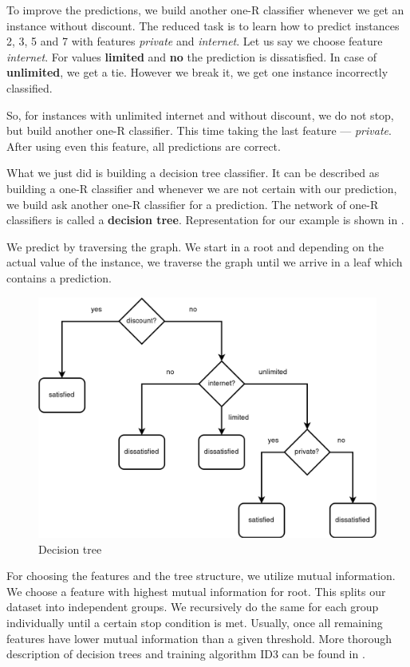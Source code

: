 To improve the predictions, we build another one-R classifier
whenever we get an instance without discount.
The reduced task is to learn how to predict instances 2, 3, 5 and 7 with features \textit{private} and \textit{internet}.
Let us say we choose feature \textit{internet}.
For values \textbf{limited} and \textbf{no} the prediction is dissatisfied.
In case of \textbf{unlimited}, we get a tie.
However we break it, we get one instance incorrectly classified.

So, for instances with unlimited internet and without discount, we do not stop, but
build another one-R classifier.
This time taking the last feature --- \textit{private}.
After using even this feature, all predictions are correct.

What we just did is building a decision tree classifier.
It can be described as
building a one-R classifier and whenever we are not certain with our prediction,
we build ask another one-R classifier for a prediction.
The network of one-R classifiers is called a \textbf{decision tree}.
Representation for our example is shown in .

We predict by traversing the graph.
We start in a root and depending on the actual value of the instance,
we traverse the graph until we arrive in a leaf which contains a prediction.

\begin{figure}[h]
	\centering
	\includegraphics[width=\textwidth]{figures/decisiontree.png}
	\caption{Decision tree} \label{fig:tree}
\end{figure}

For choosing the features and the tree structure,
we utilize mutual information.
We choose a feature with highest mutual information for root.
This splits our dataset into independent groups.
We recursively do the same for each group individually until a certain stop condition is met.
Usually, once all remaining features have lower mutual information than a given threshold.
More thorough description of decision trees and training algorithm ID3 can be found in
\citet{Quinlan1986}.





